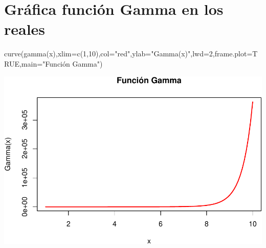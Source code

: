 \documentclass[
]{article}
\newenvironment{Shaded}{\begin{snugshade}}{\end{snugshade}}
\newcommand{\AttributeTok}[1]{\textcolor[rgb]{0.77,0.63,0.00}{#1}}
\newcommand{\ConstantTok}[1]{\textcolor[rgb]{0.00,0.00,0.00}{#1}}
\newcommand{\DecValTok}[1]{\textcolor[rgb]{0.00,0.00,0.81}{#1}}
\newcommand{\FunctionTok}[1]{\textcolor[rgb]{0.00,0.00,0.00}{#1}}
\newcommand{\NormalTok}[1]{#1}
\newcommand{\StringTok}[1]{\textcolor[rgb]{0.31,0.60,0.02}{#1}}
\begin{document}
\hypertarget{gruxe1fica-funciuxf3n-gamma-en-los-reales}{%
\section{Gráfica función Gamma en los
reales}\label{gruxe1fica-funciuxf3n-gamma-en-los-reales}}

\begin{Shaded}
\begin{Highlighting}[]
\FunctionTok{curve}\NormalTok{(}\FunctionTok{gamma}\NormalTok{(x),}\AttributeTok{xlim=}\FunctionTok{c}\NormalTok{(}\DecValTok{1}\NormalTok{,}\DecValTok{10}\NormalTok{),}\AttributeTok{col=}\StringTok{"red"}\NormalTok{,}\AttributeTok{ylab=}\StringTok{"Gamma(x)"}\NormalTok{,}\AttributeTok{lwd=}\DecValTok{2}\NormalTok{,}\AttributeTok{frame.plot=}\ConstantTok{TRUE}\NormalTok{,}\AttributeTok{main=}\StringTok{"Función Gamma"}\NormalTok{)}
\end{Highlighting}
\end{Shaded}

\includegraphics{gamma_files/figure-latex/unnamed-chunk-1-1.pdf}
\end{document}
